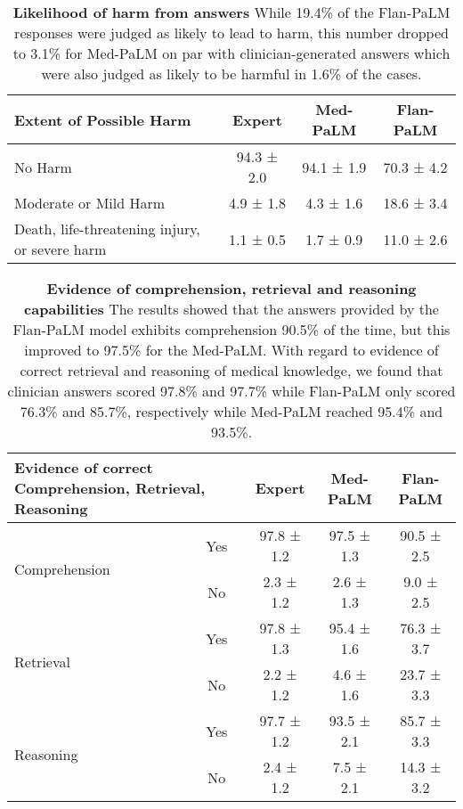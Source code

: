\begin{table}[]
\centering
\caption{\textbf{Likelihood of harm from answers} While 19.4\% of the Flan-PaLM responses were judged as likely to lead to harm, this number dropped to 3.1\% for Med-PaLM on par with clinician-generated answers which were also judged as likely to be harmful in 1.6\% of the cases.}
\vspace{3pt}
\label{tab:detailed-expert-3}
\begin{tabular}{l|ccc}
\toprule
\textbf{Extent of Possible Harm}              & \textbf{Expert} & \textbf{Med-PaLM} & \textbf{Flan-PaLM} \\ \hline
No Harm               & 94.3 ± 2.0 & 94.1 ± 1.9 & 70.3 ± 4.2 \\
Moderate or Mild Harm & 4.9 ± 1.8  & 4.3 ± 1.6  & 18.6 ± 3.4 \\
Death, life-threatening injury, or severe harm & 1.1 ± 0.5       & 1.7 ± 0.9         & 11.0 ± 2.6    \\ \bottomrule     
\end{tabular}
\end{table}

\begin{table}[]
\small
\centering
\caption{\textbf{Evidence of comprehension, retrieval and reasoning capabilities} The results showed that the answers provided by the Flan-PaLM model exhibits comprehension 90.5\% of the time, but this improved to 97.5\% for the Med-PaLM. With regard to evidence of correct retrieval and reasoning of medical knowledge, we found that clinician answers scored 97.8\% and 97.7\%  while Flan-PaLM only scored 76.3\% and 85.7\%, respectively while Med-PaLM reached 95.4\% and 93.5\%. }
\vspace{3pt}
\label{tab:detailed-expert-4}
\begin{tabular}{l|c|ccc}
\toprule
\multicolumn{2}{l|}{\textbf{Evidence of correct Comprehension, Retrieval, Reasoning}} & \textbf{Expert} & \textbf{Med-PaLM} & \textbf{Flan-PaLM} \\ \hline
\multirow{2}{*}{Comprehension} & Yes & 97.8  ± 1.2 & 97.5 ± 1.3 & 90.5 ± 2.5 \\
                               & No  & 2.3 ± 1.2   & 2.6  ± 1.3 & 9.0 ± 2.5  \\ \hline
\multirow{2}{*}{Retrieval}     & Yes & 97.8  ± 1.3 & 95.4 ± 1.6 & 76.3 ± 3.7 \\
                               & No  & 2.2 ± 1.2   & 4.6  ± 1.6 & 23.7 ± 3.3 \\ \hline
\multirow{2}{*}{Reasoning}     & Yes & 97.7  ± 1.2 & 93.5 ± 2.1 & 85.7 ± 3.3 \\ 
                               & No  & 2.4 ± 1.2   & 7.5  ± 2.1 & 14.3 ± 3.2
                               \\ \bottomrule
\end{tabular}
\end{table}


